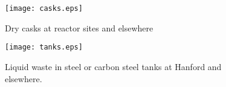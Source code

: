 

  \begin{figure}[htbp!]
    \begin{center}
    \begin{minipage}[t]{0.45\textwidth}
      \texttt{[image: casks.eps]}
      \caption{Dry casks at reactor sites and elsewhere \cite{nrc_dry_2008}}
        \label{fig:casks}
    \end{minipage}
    \hspace{0.01\textwidth}
    \begin{minipage}[t]{0.45\textwidth}
      \texttt{[image: tanks.eps]}
        \caption{Liquid waste in steel or carbon steel tanks at Hanford and
          elsewhere\cite{doe_underground_nodate}.}
        \label{fig:tanks}
    \end{minipage}
    \end{center}
  \end{figure}
